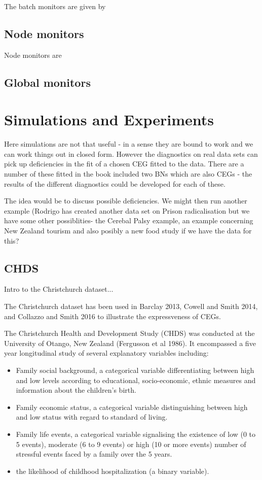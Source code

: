 \documentclass[12pt]{article}
\begin{document}
 The batch monitors are given by 
\subsection{Node monitors}
 Node monitors are
\subsection{Global monitors}

\section{Simulations and Experiments}

Here simulations are not that useful - in a sense they are bound to work and
we can work things out in closed form. However the diagnostics on real data
sets can pick up deficiencies in the fit of a chosen CEG fitted to the data.
There are a number of these fitted in the book included two BNs which are
also CEGs - the results of the different diagnostics could be developed for
each of these. 

The idea would be to discuss possible deficiencies. We might
then run another example (Rodrigo has created another data set on Prison
radicalisation but we have some other possiblities- the Cerebal Palsy
example, an example concerning New Zealand tourism and also posibly a new
food study if we have the data for this? 


\subsection{CHDS}

Intro to the Christchurch dataset...

The Christchurch dataset has been used in Barclay 2013, Cowell and Smith 2014, and Collazzo and Smith 2016 to illustrate the expressveness of CEGs. 

The Christchurch Health and Development Study (CHDS) was conducted at the University of Otango, New Zealand (Fergusson et al 1986). It encompassed a five year longitudinal study of several explanatory variables including: 
\begin{itemize}
	\item Family social background, a categorical variable differentiating between high and low levels according to educational, socio-economic, ethnic measures and information about the children’s birth.
	\item Family economic status, a categorical variable distinguishing between high and
	low status with regard to standard of living.
	\item Family life events, a categorical variable signalising the existence of low (0 to 5 events), moderate (6 to 9 events) or high (10 or more events) number of stressful events faced by a family over the 5 years.
	\item the likelihood of childhood hospitalization (a binary variable). 
\end{itemize}
\end{document}
